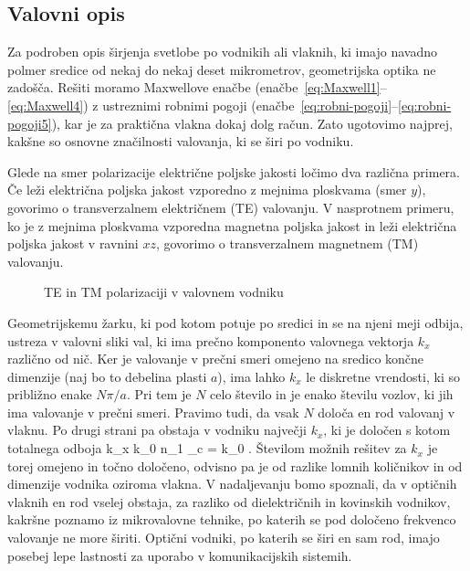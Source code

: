 \subsection{Valovni opis}
Za podroben opis širjenja svetlobe po vodnikih ali vlaknih, 
ki imajo navadno polmer
sredice od nekaj do nekaj deset mikrometrov, geometrijska optika ne
zadošča. Rešiti moramo Maxwellove enačbe (enačbe~\ref{eq:Maxwell1}--\ref{eq:Maxwell4}) 
z ustreznimi robnimi pogoji (enačbe~\ref{eq:robni-pogoji}--\ref{eq:robni-pogoji5}),
kar je za praktična vlakna dokaj dolg račun. Zato ugotovimo najprej, kakšne
so osnovne značilnosti valovanja, ki se širi po vodniku.

Glede na smer polarizacije električne poljske jakosti 
ločimo dva različna primera. Če leži električna poljska
jakost vzporedno z mejnima ploskvama (smer $y$), 
govorimo o transverzalnem električnem (TE) valovanju. 
V nasprotnem primeru, ko je 
z mejnima ploskvama vzporedna magnetna poljska jakost in 
leži električna poljska jakost v ravnini $xz$, 
govorimo o transverzalnem magnetnem (TM) valovanju.
\begin{figure}[h]
\centering
\def\svgwidth{120truemm} 

\caption{TE in TM polarizaciji v valovnem vodniku}
\label{fig:TETM}
\end{figure}

Geometrijskemu žarku, ki pod kotom potuje po sredici in se na njeni meji
odbija, ustreza v valovni sliki val, ki ima prečno komponento valovnega
vektorja $k_{x}$ različno od nič. Ker je valovanje v prečni smeri 
omejeno na sredico končne dimenzije (naj bo to debelina plasti $a$), ima lahko
$k_{x}$ le diskretne vrendosti, ki so približno enake $N\pi/a$. Pri 
tem je $N$ celo število in je enako številu vozlov, ki jih ima valovanje v prečni smeri.
Pravimo tudi, da vsak $N$ določa en rod valovanj v vlaknu. Po drugi strani 
pa obstaja v vodniku največji $k_x$, ki je določen 
s kotom totalnega odboja 
\beq
k_{x } \approx k_0 n_1 \cos\vartheta_c = k_0 .
\eeq
Številom možnih rešitev za $k_x$ je torej omejeno in točno določeno, odvisno
pa je od razlike lomnih količnikov in od dimenzije vodnika oziroma vlakna. 
V nadaljevanju bomo spoznali, da v optičnih vlaknih en rod vselej obstaja,
za razliko od dielektričnih in kovinskih vodnikov, kakršne
poznamo iz mikrovalovne tehnike, po katerih se pod določeno frekvenco
valovanje ne more širiti. Optični vodniki, po katerih se širi
en sam rod, imajo posebej lepe lastnosti za uporabo v komunikacijskih
sistemih.

